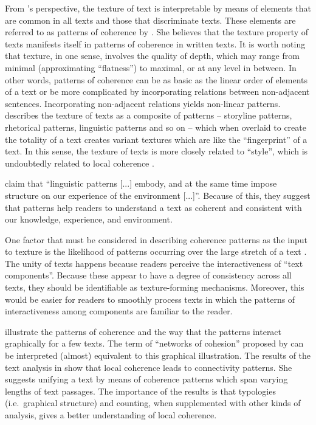 From 's perspective, the texture of text is interpretable by means of elements that are common in all texts and those that discriminate texts. 
These elements are referred to as patterns of coherence by .  
She believes that the texture property of texts manifests itself in patterns of coherence in written texts. 
It is worth noting that texture, in one sense, involves the quality of depth, which may range from minimal (approximating ``flatness'') to maximal, or at any level in between. 
In other words, patterns of coherence can be as basic as the linear order of elements of a text or be more complicated by incorporating relations between non-adjacent sentences. 
Incorporating non-adjacent relations yields non-linear patterns. 
 describes the texture of texts as a composite of patterns -- storyline patterns, rhetorical patterns, linguistic patterns and so on -- which when overlaid to create the totality of a text creates variant textures which are like the ``fingerprint'' of a text. 
In this sense, the texture of texts is more closely related to ``style'', which is undoubtedly related to local coherence \cite{barzilay08}. 

 claim that ``linguistic patterns  [...] embody, and at the same time impose structure on our experience of the environment [...]''.
Because of this, they suggest that patterns help readers to understand a text as coherent and consistent with our knowledge, experience, and environment. 

One factor that must be considered in describing coherence patterns as the input to texture is the likelihood of patterns occurring over the large stretch of a text \cite{stoddard91}.  
The unity of texts happens because readers perceive the interactiveness of ``text components''. 
Because these appear to have a degree of consistency across all texts, they should be identifiable as texture-forming mechanisms.
Moreover, this would be easier for readers to smoothly process texts in which the patterns of interactiveness among components are familiar to the reader.  


 illustrate the patterns of coherence and the way that the patterns interact graphically for a few texts. 
The term of ``networks of cohesion'' proposed by  can be interpreted (almost) equivalent to this graphical illustration. 
The results of the text analysis in  show that local coherence leads to connectivity patterns.
She suggests unifying a text by means of coherence patterns which span varying lengths of text passages. 
The importance of the results is that typologies (i.e.\ graphical structure) and counting, when supplemented with other kinds of analysis, gives a better understanding of local coherence. 


